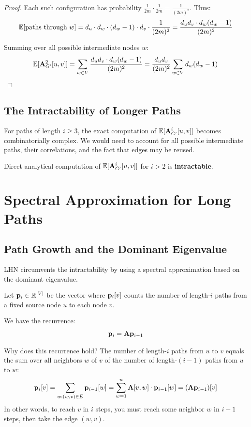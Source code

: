 \begin{notechapter}
\begin{proof}
Each such configuration has probability $\frac{1}{2m} \cdot \frac{1}{2m} = \frac{1}{(2m)^2}$. Thus:
\[
\mathbb{E}[\text{paths through } w] = d_u \cdot d_w \cdot (d_w - 1) \cdot d_v \cdot \frac{1}{(2m)^2} = \frac{d_u d_v \cdot d_w(d_w-1)}{(2m)^2}
\]

Summing over all possible intermediate nodes $w$:
\[
\mathbb{E}[\mathbf{A}_{G'}^2[u,v]] = \sum_{w \in V} \frac{d_u d_v \cdot d_w(d_w-1)}{(2m)^2} = \frac{d_u d_v}{(2m)^2} \sum_{w \in V} d_w(d_w - 1)
\]
\end{proof}

\subsection{The Intractability of Longer Paths}

For paths of length $i \geq 3$, the exact computation of $\mathbb{E}[\mathbf{A}_{G'}^i[u,v]]$ becomes combinatorially complex. We would need to account for all possible intermediate paths, their correlations, and the fact that edges may be reused.

\begin{warning}
Direct analytical computation of $\mathbb{E}[\mathbf{A}_{G'}^i[u,v]]$ for $i > 2$ is \textbf{intractable}.
\end{warning}

\section{Spectral Approximation for Long Paths}

\subsection{Path Growth and the Dominant Eigenvalue}

LHN circumvents the intractability by using a spectral approximation based on the dominant eigenvalue.

\begin{definition}
Let $\mathbf{p}_i \in \mathbb{R}^{|V|}$ be the vector where $\mathbf{p}_i[v]$ counts the number of length-$i$ paths from a fixed source node $u$ to each node $v$.
\end{definition}

We have the recurrence:
\[
\mathbf{p}_i = \mathbf{A} \mathbf{p}_{i-1}
\]

\begin{intuition}
Why does this recurrence hold? The number of length-$i$ paths from $u$ to $v$ equals the sum over all neighbors $w$ of $v$ of the number of length-$(i-1)$ paths from $u$ to $w$:
\[
\mathbf{p}_i[v] = \sum_{w : (w,v) \in E} \mathbf{p}_{i-1}[w] = \sum_{w=1}^{n} \mathbf{A}[v,w] \cdot \mathbf{p}_{i-1}[w] = (\mathbf{A} \mathbf{p}_{i-1})[v]
\]
In other words, to reach $v$ in $i$ steps, you must reach some neighbor $w$ in $i-1$ steps, then take the edge $(w,v)$.
\end{intuition}


\end{notechapter}
